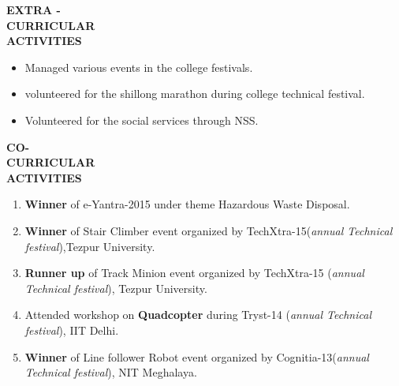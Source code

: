 \documentclass{article}
\begin{document}
	     \begin{flushleft} 
	     	
	     	
	     	
	     	\vspace{0.4in}
	     	\textbf{EXTRA - \\CURRICULAR \\ACTIVITIES }
	     	\begin{itemize}
	     		\vspace{-0.65in}
	     		\addtolength{\itemindent}{1.359in}
	     		\item  Managed various events in the college festivals.
	     		\item  volunteered for the shillong marathon during college technical festival.
	     		\item  Volunteered for the social services through NSS.  
	     		
	     	\end{itemize}
	     \end{flushleft}
	     
	      \begin{flushleft} 
	      	\vspace{0.4in}
	      	\textbf{CO- \\CURRICULAR \\ACTIVITIES }
	      	\begin{enumerate}
	      		\vspace{-0.65in}
	      		\addtolength{\itemindent}{1.359in}
	      		\item  \textbf{Winner} of e-Yantra-2015 under theme Hazardous Waste Disposal. 
	      		\item  \textbf{Winner} of Stair Climber event organized by TechXtra-15(\textit{annual Technical\\\hspace{3.4cm} festival}),Tezpur University.
	      		\item  \textbf{Runner up} of Track Minion event organized by TechXtra-15 (\textit{annual \\\hspace{3.4cm}Technical festival}), Tezpur University.  
	      		\item  Attended workshop on \textbf{Quadcopter} during Tryst-14 (\textit{annual Technical\\\hspace{3.4cm} festival}), IIT Delhi.
	      		\item  \textbf{Winner} of Line follower Robot event organized by Cognitia-13(\textit{annual \\\hspace{3.4cm}Technical festival}), NIT Meghalaya.
	      		
	      	\end{enumerate}
	      \end{flushleft}
	      
\end{document}
